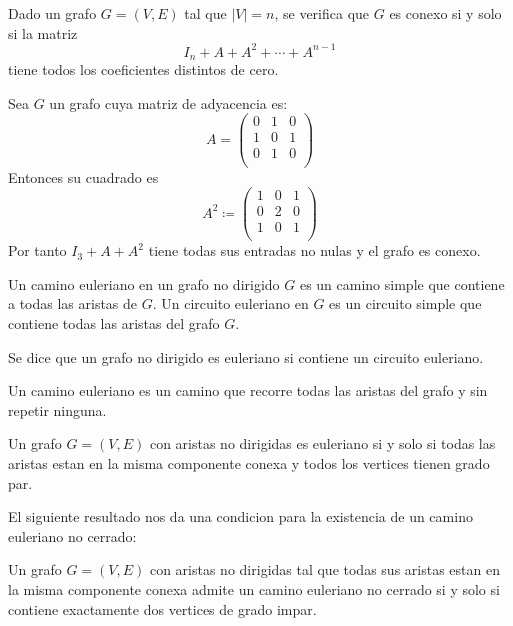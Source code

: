\begin{corollary}
	Dado un grafo \(G = (V,E )\) tal que \(|V| = n \), se verifica que \(G \) es conexo si y solo si la matriz
	\[
		I_n + A + A^{2} + \cdots + A^{n-1}
	\]
	tiene todos los coeficientes distintos de cero.
\end{corollary}
\begin{example}
	Sea \(G \) un grafo cuya matriz de adyacencia es:
	\[
		A = \begin{pmatrix}
			0 & 1 & 0 \\
			1 & 0 & 1 \\
			0 & 1 & 0 \\
		\end{pmatrix}
	\]
	Entonces su cuadrado es
	\[
		A^{2} \coloneqq \begin{pmatrix}
			1 & 0 & 1 \\
			0 & 2 & 0 \\
			1 & 0 & 1 \\
		\end{pmatrix}
	\]
	Por tanto \(I_3 + A + A^{2 } \) tiene todas sus entradas no nulas y el grafo es conexo.
\end{example}

\begin{definition}
	Un camino euleriano en un grafo no dirigido \(G \) es un camino simple que contiene a todas las aristas de \(G \). Un circuito euleriano en \(G \) es un circuito simple que contiene todas las aristas del grafo \(G \).
\end{definition}
\begin{definition}
	Se dice que un grafo no dirigido es euleriano si contiene un circuito euleriano.
\end{definition}

Un camino euleriano es un camino que recorre todas las aristas del grafo y sin repetir ninguna.

\begin{theorem}
	Un grafo \(G = (V,E )\) con aristas no dirigidas es euleriano si y solo si todas las aristas estan en la misma componente conexa y todos los vertices tienen grado par.
\end{theorem}
El siguiente resultado nos da una condicion para la existencia de un camino euleriano no cerrado:
\begin{proposition}
	Un grafo \(G = (V,E )\) con aristas no dirigidas tal que todas sus aristas estan en la misma componente conexa admite un camino euleriano no cerrado si y solo si contiene exactamente dos vertices de grado impar.
\end{proposition}

